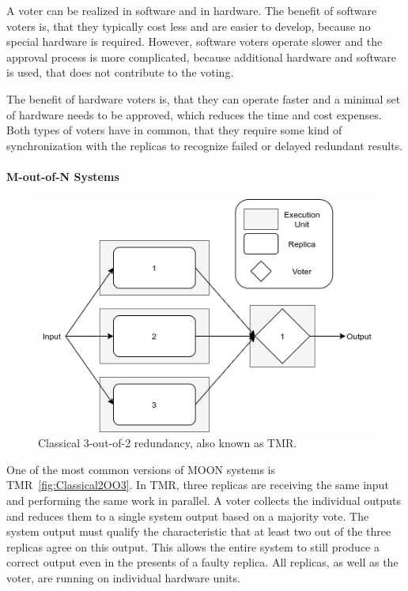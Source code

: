 A voter can be realized in software and in hardware.
The benefit of software voters is, that they typically cost less and are easier to develop, because no special hardware is required.
However, software voters operate slower and the approval process is more complicated, because additional hardware and software is used, that does not contribute to the voting.

The benefit of hardware voters is, that they can operate faster and a minimal set of hardware needs to be approved, which reduces the time and cost expenses.
Both types of voters have in common, that they require some kind of synchronization with the replicas to recognize failed or delayed redundant results.

\paragraph{M-out-of-N Systems}
\begin{figure}[!hb]
	\centering
	\includegraphics[width=0.75\linewidth]{images/Classical2OO3}
	\caption{Classical 3-out-of-2 redundancy, also known as \Gls*{TMR}.}
	\label{fig:Classical2OO3}
\end{figure}

One of the most common versions of \gls*{MOON} systems is \gls*{TMR}~\autoref{fig:Classical2OO3}.
In \gls*{TMR}, three replicas are receiving the same input and performing the same work in parallel.
A voter collects the individual outputs and reduces them to a single system output based on a majority vote.
The system output must qualify the characteristic that at least two out of the three replicas agree on this output.
This allows the entire system to still produce a correct output even in the presents of a faulty replica.
All replicas, as well as the voter, are running on individual hardware units.

